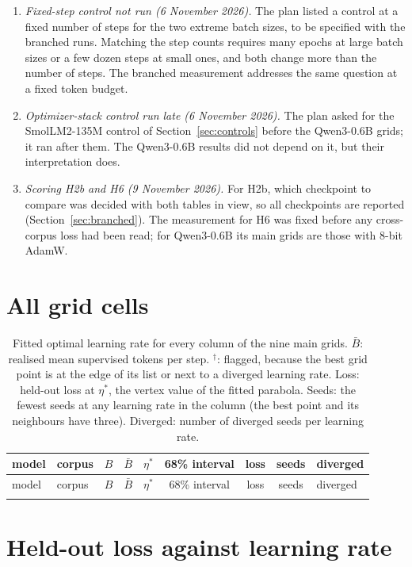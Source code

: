 \documentclass[10pt]{article}
\begin{document}
\begin{enumerate}
\item \emph{Fixed-step control not run (6 November 2026).} The plan listed a control at a fixed number of steps for the two extreme batch sizes, to be specified with the branched runs. Matching the step counts requires many epochs at large batch sizes or a few dozen steps at small ones, and both change more than the number of steps. The branched measurement addresses the same question at a fixed token budget.
\item \emph{Optimizer-stack control run late (6 November 2026).} The plan asked for the SmolLM2-135M control of Section~\ref{sec:controls} before the Qwen3-0.6B grids; it ran after them. The Qwen3-0.6B results did not depend on it, but their interpretation does.
\item \emph{Scoring H2b and H6 (9 November 2026).} For H2b, which checkpoint to compare was decided with both tables in view, so all checkpoints are reported (Section~\ref{sec:branched}). The measurement for H6 was fixed before any cross-corpus loss had been read; for Qwen3-0.6B its main grids are those with 8-bit AdamW.
\end{enumerate}

\section{All grid cells}\label{app:cells}

\footnotesize
\setlength{\tabcolsep}{3pt}
\begin{longtable}{llrrccccl}
\caption{Fitted optimal learning rate for every column of the nine main grids. $\bar{B}$: realised mean supervised tokens per step. $^{\dagger}$: flagged, because the best grid point is at the edge of its list or next to a diverged learning rate. Loss: held-out loss at $\eta^*$, the vertex value of the fitted parabola. Seeds: the fewest seeds at any learning rate in the column (the best point and its neighbours have three). Diverged: number of diverged seeds per learning rate.}\label{tab:cells}\\
\toprule
model & corpus & $B$ & $\bar{B}$ & $\eta^*$ & 68\% interval & loss & seeds & diverged \\
\midrule
\endfirsthead
\toprule
model & corpus & $B$ & $\bar{B}$ & $\eta^*$ & 68\% interval & loss & seeds & diverged \\
\midrule
\endhead
\bottomrule
\endfoot

\end{longtable}
\normalsize

\clearpage
\section{Held-out loss against learning rate}\label{app:curves}
\end{document}
